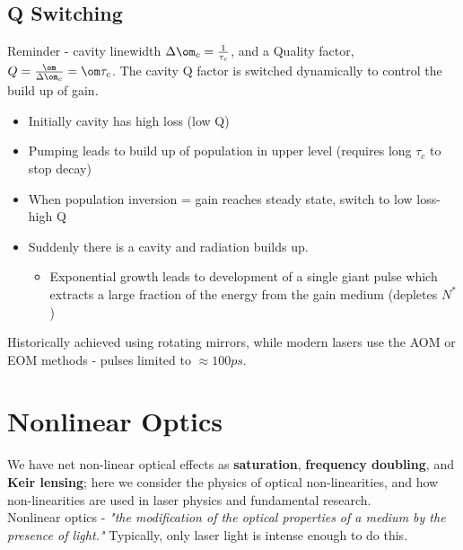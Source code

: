 \documentclass[a4paper, 11pt, normalem]{report}
\begin{document}
\section{Q Switching}
Reminder - cavity linewidth $\Delta\om_c = \frac{1}{\tau_c}$, and a Quality factor, $Q = \frac{\om}{\Delta\om_c} = \om\tau_c$.
The cavity Q factor is switched dynamically to control the build up of gain. 
\begin{figure}[H]
    \centering
\end{figure}
\begin{itemize}
    \item Initially cavity has high loss (low Q)
    \item Pumping leads to build up of population in upper level (requires long $\tau_c$ to stop decay)
    \item When population inversion = gain reaches steady state, switch to low loss-high Q
    \item Suddenly there is a cavity and radiation builds up.
        \begin{itemize}
            \item Exponential growth leads to development of a single giant pulse which extracts a large fraction of the energy from the gain medium (depletes $N^*$)
        \end{itemize}
\end{itemize}
Historically achieved using rotating mirrors, while modern lasers use the AOM or EOM methods - pulses limited to $\approx 100ps$. 

\chapter{Nonlinear Optics}
We have net non-linear optical effects as \textbf{saturation}, \textbf{frequency doubling}, and \textbf{Keir lensing}; here we consider the physics of optical non-linearities, and how non-linearities are used in laser physics and fundamental research. \\
Nonlinear optics - \emph{"the modification of the optical properties of a medium by the presence of light."}
Typically, only laser light is intense enough to do this. 
\end{document}
